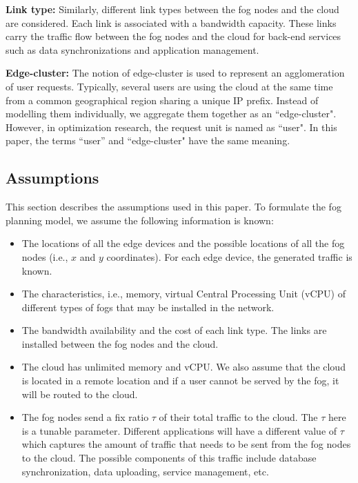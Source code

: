 \documentclass[10pt,journal,compsoc]{IEEEtran}
\begin{document}
\textbf{Link type: }Similarly, different link types between the fog nodes and the cloud are considered. Each link is associated with a bandwidth capacity. These links carry the traffic flow between the fog nodes and the cloud for back-end services such as data synchronizations and application management.

\textbf{Edge-cluster: }The notion of edge-cluster is used to represent an agglomeration of user requests. Typically, several users are using the cloud at the same time from a common geographical region sharing a unique IP prefix. Instead of modelling them individually, we aggregate them together as an ``edge-cluster". However, in optimization research, the request unit is named as ``user". In this paper, the terms ``user'' and ``edge-cluster" have the same meaning.



\subsection{Assumptions}\label{assumption}
This section describes the assumptions used in this paper. To formulate the fog planning model, we assume the following information is known:  
\begin{itemize}
\item The locations of all the edge devices and the possible locations of all the fog nodes (i.e., $x$ and $y$ coordinates). For each edge device, the generated traffic is known.
\item The characteristics, i.e., memory, virtual Central Processing Unit (vCPU) of different types of fogs that may be installed in the network.
\item The bandwidth availability and the cost of each link type. The links are installed between the fog nodes and the cloud.
\item The cloud has unlimited memory and vCPU. We also assume that the cloud is located in a remote location and if a user cannot be served by the fog, it will be routed to the cloud.
\item The fog nodes send a fix ratio $\tau$ of their total traffic to the cloud. The $\tau$ here is a tunable parameter. Different applications will have a different value of $\tau$ which captures the amount of traffic that needs to be sent from the fog nodes to the cloud. The possible components of this traffic include database synchronization, data uploading, service management, etc.
\end{itemize}
\end{document}
